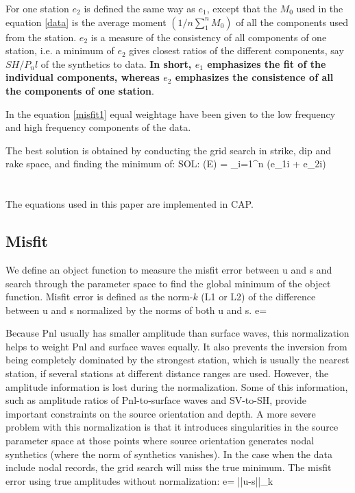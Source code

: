 \documentclass[11pt,titlepage,fleqn]{article}
\begin{document}
For one station $e_2$ is defined the same way as $e_1$, except that the $M_0$ used in the equation \ref{data} is the average moment $(1/n\sum_1^n M_0)$ of all the components used from the station. $e_2$ is a measure of the consistency of all components of one station, i.e. a minimum of $e_2$ gives closest ratios of the different components, say $SH/P_nl$ of the synthetics to data. {\bf In short, $e_1$ emphasizes the fit of the individual components, whereas $e_2$ emphasizes the consistence of all the components of one station}.

In the equation \ref{misfit1} equal weightage have been given to the low frequency and high frequency components of the data.

The best solution is obtained by conducting the grid search in strike, dip and rake space, and finding the minimum of:
\eq
SOL: \min(E) =  \sum_{i=1}^{n} (e_{1i} + e_{2i})
\en

\section{\cite{ZhuHelm1996}}
The equations used in this paper are implemented in CAP. 
\subsection{Misfit}
We define an object function to measure the misfit error between u and s and search through the parameter space to find the global minimum of the object function.
Misfit error is defined as the norm-$k$ (L1 or L2) of the difference between u and s normalized by the norms of both u and s.
\eq
e= 
\en

Because Pnl usually has smaller amplitude than surface waves, this normalization helps to weight Pnl and surface waves equally. It also prevents the inversion from being completely dominated by the strongest station, which is usually the nearest station, if several stations at different distance ranges are used. However, the amplitude information is lost during the normalization. Some of this information, such as amplitude ratios of Pnl-to-surface waves and SV-to-SH, provide important constraints on the source orientation and depth. A more severe problem with this normalization is that it introduces singularities in the source parameter space at those points where source orientation generates nodal synthetics (where the norm of synthetics vanishes). In the case when the data include nodal records, the grid search will miss the true minimum. The misfit error using true amplitudes without normalization:
\eq
e= {||u-s||_k}
\en
\end{document}

